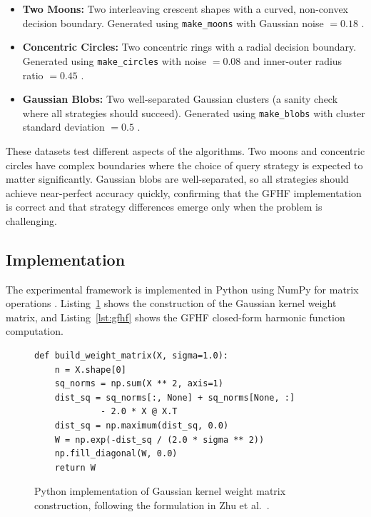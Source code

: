 \documentclass[12pt]{article}
\begin{document}
\begin{itemize}
\item \textbf{Two Moons:} Two interleaving crescent shapes with a curved, non-convex decision boundary. Generated using \texttt{make\_moons} with Gaussian noise $= 0.18$ \cite{Pedregosa2011}.
\item \textbf{Concentric Circles:} Two concentric rings with a radial decision boundary. Generated using \texttt{make\_circles} with noise $= 0.08$ and inner-outer radius ratio $= 0.45$ \cite{Pedregosa2011}.
\item \textbf{Gaussian Blobs:} Two well-separated Gaussian clusters (a sanity check where all strategies should succeed). Generated using \texttt{make\_blobs} with cluster standard deviation $= 0.5$ \cite{Pedregosa2011}.
\end{itemize}

These datasets test different aspects of the algorithms. Two moons and concentric circles have complex boundaries where the choice of query strategy is expected to matter significantly. Gaussian blobs are well-separated, so all strategies should achieve near-perfect accuracy quickly, confirming that the GFHF implementation is correct and that strategy differences emerge only when the problem is challenging.

\subsection{Implementation}

The experimental framework is implemented in Python using NumPy for matrix operations \cite{Harris2020}. Listing~\ref{lst:weight_matrix} shows the construction of the Gaussian kernel weight matrix, and Listing~\ref{lst:gfhf} shows the GFHF closed-form harmonic function computation.

\begin{figure}[H]
{\small
\begin{verbatim}
def build_weight_matrix(X, sigma=1.0):
    n = X.shape[0]
    sq_norms = np.sum(X ** 2, axis=1)
    dist_sq = sq_norms[:, None] + sq_norms[None, :]
             - 2.0 * X @ X.T
    dist_sq = np.maximum(dist_sq, 0.0)
    W = np.exp(-dist_sq / (2.0 * sigma ** 2))
    np.fill_diagonal(W, 0.0)
    return W
\end{verbatim}
}
\caption{Python implementation of Gaussian kernel weight matrix construction, following the formulation in Zhu et al.\ \cite{Zhu2003}.}
\label{lst:weight_matrix}
\end{figure}
\end{document}
